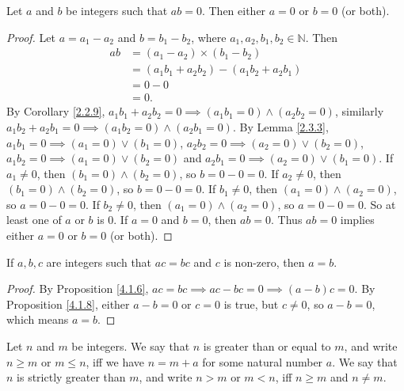 \begin{proposition}\label{4.1.8}
Let \(a\) and \(b\) be integers such that \(ab = 0\).
Then either \(a = 0\) or \(b = 0\) (or both).
\end{proposition}

\begin{proof}
Let \(a = a_1 - a_2\) and \(b = b_1 - b_2\), where \(a_1, a_2, b_1, b_2 \in \mathds{N}\).
Then
\begin{align*}
ab &= (a_1 - a_2) \times (b_1 - b_2) \\
&= (a_1b_1 + a_2b_2) - (a_1b_2 + a_2b_1) \\
&= 0 - 0 \\
&= 0.
\end{align*}
By Corollary \ref{2.2.9}, \(a_1b_1 + a_2b_2 = 0 \implies (a_1b_1 = 0) \land (a_2b_2 = 0)\), similarly \(a_1b_2 + a_2b_1 = 0 \implies (a_1b_2 = 0) \land (a_2b_1 = 0)\).
By Lemma \ref{2.3.3}, \(a_1b_1 = 0 \implies (a_1 = 0) \lor (b_1 = 0)\), \(a_2b_2 = 0 \implies (a_2 = 0) \lor (b_2 = 0)\), \(a_1b_2 = 0 \implies (a_1 = 0) \lor (b_2 = 0)\) and \(a_2b_1 = 0 \implies (a_2 = 0) \lor (b_1 = 0)\).
If \(a_1 \neq 0\), then \((b_1 = 0) \land (b_2 = 0)\), so \(b = 0 - 0 = 0\).
If \(a_2 \neq 0\), then \((b_1 = 0) \land (b_2 = 0)\), so \(b = 0 - 0 = 0\).
If \(b_1 \neq 0\), then \((a_1 = 0) \land (a_2 = 0)\), so \(a = 0 - 0 = 0\).
If \(b_2 \neq 0\), then \((a_1 = 0) \land (a_2 = 0)\), so \(a = 0 - 0 = 0\).
So at least one of \(a\) or \(b\) is \(0\).
If \(a = 0\) and \(b = 0\), then \(ab = 0\).
Thus \(ab = 0\) implies either \(a = 0\) or \(b = 0\) (or both).
\end{proof}

\begin{corollary}\label{4.1.9}
If \(a, b, c\) are integers such that \(ac = bc\) and \(c\) is non-zero, then \(a = b\).
\end{corollary}

\begin{proof}
By Proposition \ref{4.1.6}, \(ac = bc \implies ac - bc = 0 \implies (a - b)c = 0\).
By Proposition \ref{4.1.8}, either \(a - b = 0\) or \(c = 0\) is true, but \(c \neq 0\), so \(a - b = 0\), which means \(a = b\).
\end{proof}

\begin{definition}\label{4.1.10}
Let \(n\) and \(m\) be integers.
We say that \(n\) is greater than or equal to \(m\), and write \(n \geq m\) or \(m \leq n\), iff we have \(n = m + a\) for some natural number \(a\).
We say that \(n\) is strictly greater than \(m\), and write \(n > m\) or \(m < n\), iff \(n \geq m\) and \(n \neq m\).
\end{definition}

